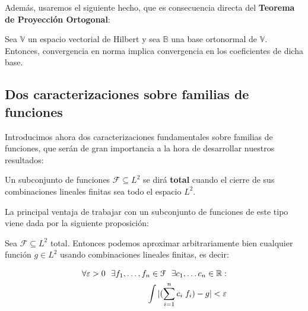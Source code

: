 Además, usaremos el siguiente hecho, que es consecuencia directa del \textbf{Teorema de Proyección Ortogonal}:

\begin{proposicion}

	Sea $\mathbb{V}$ un espacio vectorial de Hilbert y sea $\mathbb{B}$ una base ortonormal de $\mathbb{V}$. Entonces, convergencia en norma implica convergencia en los coeficientes de dicha base.

\end{proposicion}


\subsection{Dos caracterizaciones sobre familias de funciones} \label{subs:caracterizaciones_familias_funciones}

Introducimos ahora dos caracterizaciones fundamentales sobre familias de funciones, que serán de gran importancia a la hora de desarrollar nuestros resultados:

\begin{definicion}
	Un subconjunto de funciones $\mathcal{F} \subseteq L^2$ se dirá \textbf{total} cuando el cierre de sus combinaciones lineales finitas sea todo el espacio $L^2$.
\end{definicion}

La principal ventaja de trabajar con un subconjunto de funciones de este tipo viene dada por la siguiente proposición:

\begin{proposicion} \label{prop:conjuntos_totales_epsilon_aproximacion}
	Sea $\mathcal{F} \subseteq L^2$ total. Entonces podemos aproximar arbitrariamente bien cualquier función $g \in L^2$ usando combinaciones lineales finitas, es decir:

	\begin{equation} \label{eq:conjuntos_totales_epsilon_aproximacion}
		\begin{split}
			\forall \varepsilon > 0 \ \  \exists f_1, \ldots, f_n \in \mathcal{F} \ \  \exists c_1, \ldots c_n \in \mathbb{R}:\\
			\int | (\sum_{i = 1}^n c_i \; f_i) - g| < \varepsilon \\
		\end{split}
	\end{equation}

\end{proposicion}

